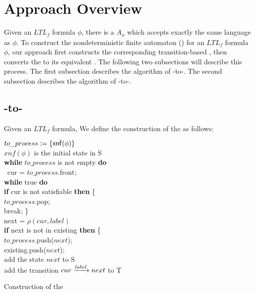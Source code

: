\section{Approach Overview}
Given an $LTL_f$ formula $\phi$, there is a \NFA $A_{\phi}$ which accepts exactly the same language as $\phi$. To construct the nondeterministic finite automaton (\NFA) for an $ LTL_f$ formula $\phi$, our approach first constructs the corresponding transition-based \NFA, then converts the \TNFA to its equivalent \NFA. The following two subsections will describe this process. The first subsection describes the algorithm of \ltlf-to-\TNFA. The second subsection describes the algorithm of \TNFA-to-\NFA.

\subsection{\ltlf-to-\TNFA}
Given an  $ LTL_f$ formula, We define the construction of the \TNFA  as follows: \\
  \begin{algorithm}[H]
    \SetAlgoNoLine
    \BlankLine
 $to\_process:= \{{\sf xnf}(\phi)\}$\\
 $xnf(\phi)$ is the initial state in S\\
\textbf{while} $to\_process$ is not empty \textbf{do} \\
\ cur =  $to\_process$.front;  \\
\quad  \textbf{while} true \textbf{do} \\
\qquad   \textbf{if} cur is not satisfiable  \textbf{then} \{ \\
\qquad \quad $to\_process$.pop; \\
\qquad \quad break;     \}\\
 \qquad  next = $\rho(cur, label)$ \\
\qquad\textbf{if} next is not in existing \textbf{then} \{ \\
\qquad \quad $to\_process$.push($next$); \\
\qquad \quad existing.push($next$); \\
\qquad  \quad add the state $next$ to S\\
\qquad  add the transition $cur\xrightarrow[]{label}next$ to T
 \caption{Construction of the \TNFA}
\end{algorithm}

